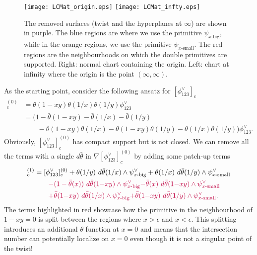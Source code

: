 \documentclass[11pt]{article}
\newcommand{\nn}{\nonumber}
\newcommand{\xbig}{{x\text{-big}}}
\newcommand{\xsmall}{{x\text{-small}}}
\renewcommand{\th}{\theta}
\begin{document}
\begin{figure}
	\centering
	\texttt{[image: LCMat\_origin.eps]}
	\qquad
	\texttt{[image: LCMat\_infty.eps]}
	\caption{ \label{fig:LCprimitives}
		The removed surfaces (twist and the hyperplanes at $\infty$) are shown in purple. 
		The blue regions are where we use the primitive $\psi_\xbig$, while in the orange regions, we use the primitive $\psi_\xsmall$. 
		The red regions are the neighbourhoods on which the double primitives are supported.
		Right: normal chart containing the origin. 
		Left: chart at infinity where the origin is the point $(\infty,\infty)$.
	}
\end{figure}

As the starting point, consider the following ansatz for $[\phi^\vee_{123}]_c$
\begin{align}
	[\phi^\vee_{123}]_c^{(0)}
	&=\theta(1-xy) \theta(1/x) \theta(1/y) \phi^\vee_{123}
	\nn \\
	&= \Big(
		1 - \bar\th(1-xy) - \bar\th (1/x) - \bar\th(1/y) 
		\nn \\ & \qquad
		- \bar\th(1-xy) \bar\th(1/x) - \bar\th(1-xy)\bar\th(1/y) - \bar\th(1/x) \bar\th(1/y) 
	\Big) \phi^\vee_{123}.
\end{align}
Obviously, $[\phi^\vee_{123}]_c^{(0)}$ has compact support but is not closed. We can remove all the terms with a single $d\bar\theta$ in $\nabla[\phi^\vee_{123}]_c^{(0)}$ by adding some patch-up terms
\begin{align}
	[\phi^\vee_{123}]_c^{(1)}
	&= [\phi^\vee_{123}]_c^{(0)} 
	+ \theta(1/y)\ d\bar{\theta}(1/x) \wedge \psi_\xbig^\vee
	+ \theta(1/x)\ d\bar{\theta}(1/y) \wedge \psi_\xsmall^\vee
	\nn \\ & \qquad
	{\color{purple} 
		- (1-\bar{\theta}(x)) \ d\bar{\theta}(1{-}xy)\wedge\psi_\xbig^\vee 
	}
	{\color{purple} 
		- \bar{\theta}(x) \ d\bar{\theta}(1{-}xy) \wedge\psi_\xsmall^\vee
	}
	\nn \\ & \qquad
	{\color{purple} 
		+ \bar{\theta}(1{-}xy) \ d\bar{\theta}(1/x) \wedge \psi_\xbig^\vee 
	}
	{\color{purple} 
		+ \bar{\theta}(1{-}xy) \ d\bar{\theta}(1/y) \wedge \psi_\xsmall^\vee
	}.
%
\end{align}
The terms highlighted in red showcase how the primitive in the neighbourhood of $1-xy=0$ is split between the regions where $x>\epsilon$ and $x<\epsilon$. This splitting introduces an additional $\theta$ function at $x=0$ and means that the intersection number can potentially localize on $x=0$ even though it is not a singular point of the twist! 
\end{document}
